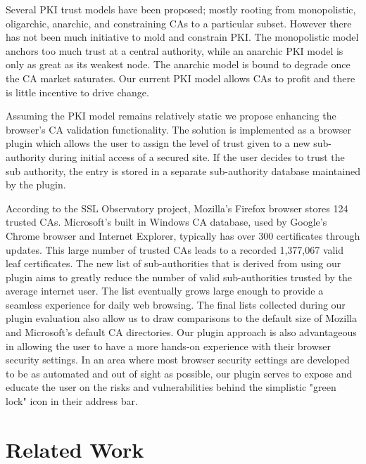 \documentclass[10pt,twocolumn,pdftex]{article}
\begin{document}
Several PKI trust models have been proposed; mostly rooting from monopolistic, oligarchic, anarchic, and constraining CAs to a particular subset.\cite{kaufman2002network} However there has not been much initiative to mold and constrain PKI. The monopolistic model anchors too much trust at a central authority, while an anarchic PKI model is only as great as its weakest node. The anarchic model is bound to degrade once the CA market saturates. Our current PKI model allows CAs to profit and there is little incentive to drive change.

Assuming the PKI model remains relatively static we propose enhancing the browser’s CA validation functionality.  The solution is implemented as a browser plugin which allows the user to assign the level of trust given to a new sub-authority during initial access of a secured site. If the user decides to trust the sub authority, the entry is stored in a separate sub-authority database maintained by the plugin.

According to the SSL Observatory project, Mozilla’s Firefox browser stores 124 trusted CAs.  Microsoft’s built in Windows CA database, used by Google’s Chrome browser and Internet Explorer, typically has over 300 certificates through updates.  This large number of trusted CAs leads to a recorded 1,377,067 valid leaf certificates. \cite{SSLobservatory}  The new list of sub-authorities that is derived from using our plugin aims to greatly reduce the number of valid sub-authorities trusted by the average internet user.  The list eventually grows large enough to provide a seamless experience for daily web browsing.  The final lists collected during our plugin evaluation also allow us to draw comparisons to the default size of Mozilla and Microsoft’s default CA directories.  Our plugin approach is also advantageous in allowing the user to have a more hands-on experience with their browser security settings.  In an area where most browser security settings are developed to be as automated and out of sight as possible, our plugin serves to expose and educate the user on the risks and vulnerabilities behind the simplistic "green lock" icon in their address bar. 





\hspace{1em}

\section{Related Work}
\end{document}
